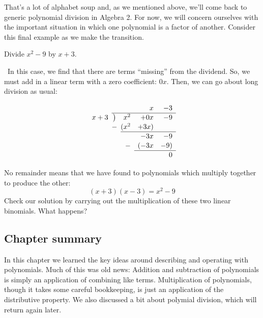 That's a lot of alphabet soup and, as we mentioned above, we'll come back to generic polynomial division in Algebra 2. For now, we will concern ourselves with the important situation in which one polynomial is a factor of another. Consider this final example as we make the transition.

\begin{boxedex}
Divide $x^2-9$ by $x+3$.

\exsoln\ In this case, we find that there are terms ``missing'' from the dividend. So, we must add in a linear term with a zero coefficient: $0x$. Then, we can go about long division as usual:

\[
\renewcommand\arraystretch{1.1}
\begin{array}{*1r @{\hskip\arraycolsep}c@{\hskip\arraycolsep} *3r}
		&	~	&&x&-3\\
\cline{2-5}
x+3	&\big)	&x^2&+0x&-9\\
		&-		&(x^2&+3x)\\
\cline{3-5}
		&		&&-3x&-9\\
		&		&-&(-3x&-9)\\
\cline{4-5}
		&		&&&0
\end{array}
\]

No remainder means that we have found to polynomials which multiply together to produce the other:
\[(x+3)(x-3) = x^2 - 9\]
Check our solution by carrying out the multiplication of these two linear binomials. What happens?
\end{boxedex}

\subsection*{Chapter summary}

In this chapter we learned the key ideas around describing and operating with polynomials. Much of this was old news: Addition and subtraction of polynomials is simply an application of combining like terms. Multiplication of polynomials, though it takes some careful bookkeeping, is just an application of the distributive property. We also discussed a bit about polymial division, which will return again later.
